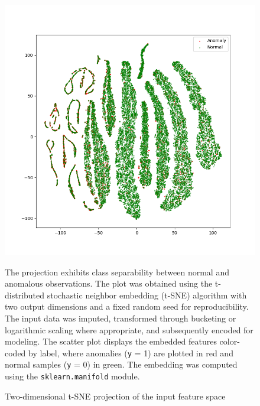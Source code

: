 \begin{figure}[!t]
    \centering
    \footnotesize
    \includegraphics[width=0.75\linewidth,trim={1cm 1cm 1cm 1cm},clip]{../../results/figures/raw_tsne.png}
    \caption{Two-dimensional t-SNE projection of the input feature space}
    \label{fig:tsne_input}
    \vspace{1mm}
    \begin{minipage}{\columnwidth}
        The projection exhibits class separability between normal and anomalous observations. The plot was obtained using the t-distributed stochastic neighbor embedding (t-SNE) algorithm with two output dimensions and a fixed random seed for reproducibility. The input data was imputed, transformed through bucketing or logarithmic scaling where appropriate, and subsequently encoded for modeling. The scatter plot displays the embedded features color-coded by label, where anomalies (\texttt{y} = 1) are plotted in red and normal samples (\texttt{y} = 0) in green. The embedding was computed using the \texttt{sklearn.manifold} module.
    \end{minipage}
\end{figure}